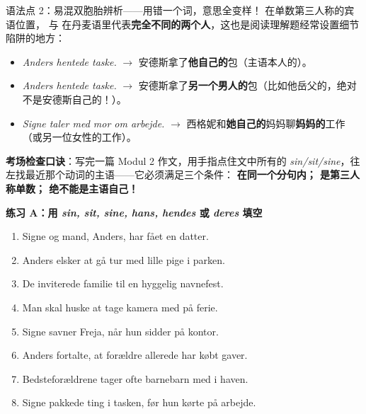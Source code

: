 \begin{grammatikbox}{语法点 2：易混双胞胎辨析——用错一个词，意思全变样！}
在单数第三人称的宾语位置， 与  在丹麦语里代表\textbf{完全不同的两个人}，这也是阅读理解题经常设置细节陷阱的地方：
\begin{itemize}
  \item \textit{Anders hentede  taske.} $\rightarrow$ 安德斯拿了\textbf{他自己的}包（主语本人的）。
  \item \textit{Anders hentede  taske.} $\rightarrow$ 安德斯拿了\textbf{另一个男人的}包（比如他岳父的，绝对不是安德斯自己的！）。
  \item \textit{Signe taler med  mor om  arbejde.} $\rightarrow$ 西格妮和\textbf{她自己的}妈妈聊\textbf{妈妈的}工作（或另一位女性的工作）。
\end{itemize}
\textbf{考场检查口诀}：写完一篇 Modul 2 作文，用手指点住文中所有的 \textit{sin/sit/sine}，往左找最近那个动词的主语——它必须满足三个条件：\textbf{ 在同一个分句内； 是第三人称单数； 绝不能是主语自己！}
\end{grammatikbox}


\textbf{练习 A：用 \textit{sin, sit, sine, hans, hendes} 或 \textit{deres} 填空}
\begin{enumerate}
  \item Signe og \underline{\hspace{1.8cm}} mand, Anders, har fået en datter.
  \item Anders elsker at gå tur med \underline{\hspace{1.8cm}} lille pige i parken.
  \item De inviterede \underline{\hspace{1.8cm}} familie til en hyggelig navnefest.
  \item Man skal huske at tage \underline{\hspace{1.8cm}} kamera med på ferie.
  \item Signe savner Freja, når hun sidder på \underline{\hspace{1.8cm}} kontor.
  \item Anders fortalte, at \underline{\hspace{1.8cm}} forældre allerede har købt gaver.
  \item Bedsteforældrene tager ofte \underline{\hspace{1.8cm}} barnebarn med i haven.
  \item Signe pakkede \underline{\hspace{1.8cm}} ting i tasken, før hun kørte på arbejde.
\end{enumerate}

